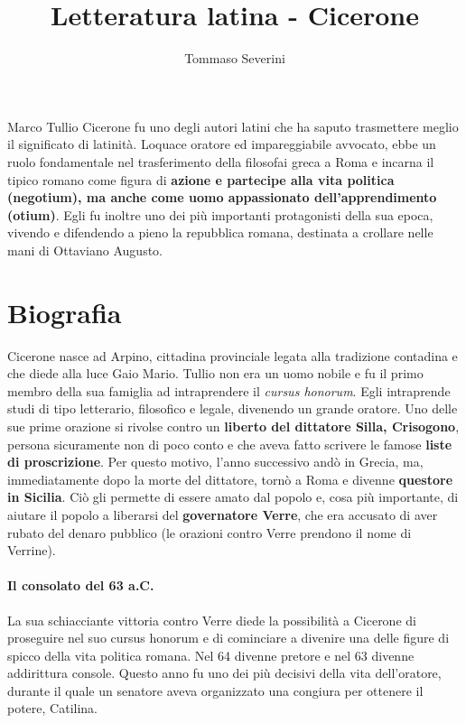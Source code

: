 \documentclass[10pt,a4paper]{article}
\author{Tommaso Severini}
\title{Letteratura latina - Cicerone}
\begin{document}
	\maketitle

 Marco Tullio Cicerone fu uno degli autori latini che ha saputo trasmettere meglio il significato di latinità. Loquace oratore ed impareggiabile avvocato, ebbe un ruolo fondamentale nel trasferimento della filosofai greca a Roma e incarna il tipico romano come figura di \textbf{azione e partecipe alla vita politica (negotium), ma anche come uomo appassionato dell'apprendimento (otium)}. Egli fu inoltre uno dei più importanti protagonisti della sua epoca, vivendo e difendendo a pieno la repubblica romana, destinata a crollare nelle mani di Ottaviano Augusto. 

\part*{Biografia}

Cicerone nasce ad Arpino, cittadina provinciale legata alla tradizione contadina e che diede alla luce Gaio Mario. Tullio non era un uomo nobile e fu il primo membro della sua famiglia ad intraprendere il \textit{cursus honorum}. Egli intraprende studi di tipo letterario, filosofico e legale, divenendo un grande oratore. Uno delle sue prime orazione si rivolse contro un \textbf{liberto del dittatore Silla, Crisogono}, persona sicuramente non di poco conto e che aveva fatto scrivere le famose \textbf{liste di proscrizione}. Per questo motivo, l'anno successivo andò in Grecia, ma, immediatamente dopo la morte del dittatore, tornò a Roma e divenne \textbf{questore in Sicilia}. Ciò gli permette di essere amato dal popolo e, cosa più importante, di aiutare il popolo a liberarsi del \textbf{governatore Verre}, che era accusato di aver rubato del denaro pubblico (le orazioni contro Verre prendono il nome di Verrine). 

\subsection*{Il consolato del 63 a.C.}

La sua schiacciante vittoria contro Verre diede la possibilità a Cicerone di proseguire nel suo cursus honorum e di cominciare a divenire una delle figure di spicco della vita politica romana. Nel 64 divenne pretore e nel 63 divenne addirittura console. Questo anno fu uno dei più decisivi della vita dell'oratore, durante il quale un senatore aveva organizzato una congiura per ottenere il potere, Catilina.\\
\end{document}
